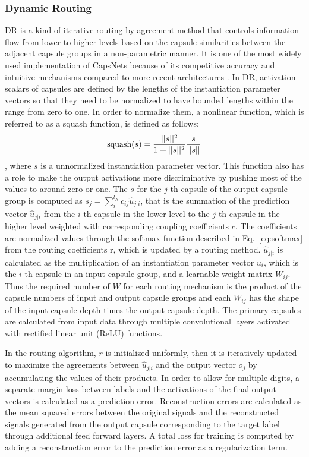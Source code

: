\documentclass[review]{elsarticle}
\begin{document}
\subsubsection{Dynamic Routing} %
DR \citep{DBLP:conf/nips/SabourFH17} is a kind of iterative routing-by-agreement method that controls information flow from lower to higher levels based on the capsule similarities between the adjacent capsule groups in a non-parametric manner.
It is one of the most widely used implementation of CapsNets because of its competitive accuracy and intuitive mechanisms compared to more recent architectures  \citep{DBLP:conf/nips/HahnPK19, Malmgren1314210}.
In DR, activation scalars of capsules are defined by the lengths of the instantiation parameter vectors so that they need to be normalized to have bounded lengths within the range from zero to one.
In order to normalize them, a nonlinear function, which is referred to as a squash function, is defined as follows:
\begin{equation}
\text{squash}(s) = {{||s||^2} \over{1+||s||^2}} {{s}\over{||s||}}
\label{eq:squash}
\end{equation}
, where $s$ is a unnormalized instantiation parameter vector.
This function also has a role to make the output activations more discriminative by pushing most of the values to around zero or one.
The $s$ for the $j$-th capsule of the output capsule group is computed as $s_j = \sum^{l_N}_i c_{ij} \hat{u}_{j|i}$, that is the summation of the prediction vector $\hat{u}_{j|i}$ from the $i$-th capsule in the lower level to the $j$-th capsule in the higher level weighted with corresponding coupling coefficients $c$.
The coefficients are normalized values through the softmax function described in Eq.~\ref{eq:softmax} from the routing coefficients r, which is updated by a routing method.
$\hat{u}_{j|i}$ is calculated as the multiplication of an instantiation parameter vector $u_i$, which is the $i$-th capsule in an input capsule group, and a learnable weight matrix $W_{ij}$.
Thus the required number of $W$ for each routing mechanism is the product of the capsule numbers of input and output capsule groups and each $W_{ij}$ has the shape of the input capsule depth times the output capsule depth.
The primary capsules are calculated from input data through multiple convolutional layers activated with rectified linear unit (ReLU) functions.

In the routing algorithm, $r$ is initialized uniformly, then it is iteratively updated to maximize the agreements between $\hat{u}_{j|i}$ and the output vector $o_j$ by accumulating the values of their products.
In order to allow for multiple digits, a separate margin loss between labels and the activations of the final output vectors is calculated as a prediction error.
Reconstruction errors are calculated as the mean squared errors between the original signals and the reconstructed signals generated from the output capsule corresponding to the target label through additional feed forward layers.
A total loss for training is computed by adding a reconstruction error to the prediction error as a regularization term.
\end{document}
